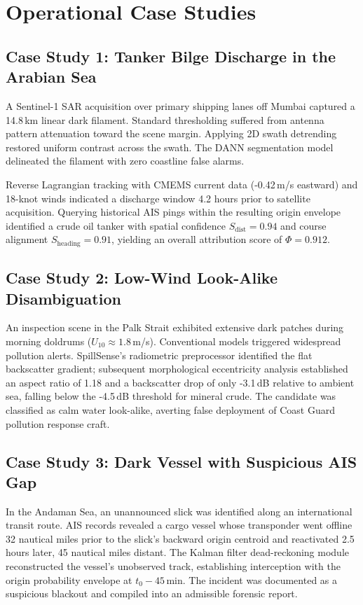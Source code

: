 \documentclass[conference]{IEEEtran}
\begin{document}
\section{Operational Case Studies}

\subsection{Case Study 1: Tanker Bilge Discharge in the Arabian Sea}
A Sentinel-1 SAR acquisition over primary shipping lanes off Mumbai captured a 14.8\,km linear dark filament. Standard thresholding suffered from antenna pattern attenuation toward the scene margin. Applying 2D swath detrending restored uniform contrast across the swath. The DANN segmentation model delineated the filament with zero coastline false alarms. 

Reverse Lagrangian tracking with CMEMS current data (-0.42\,m/s eastward) and 18-knot winds indicated a discharge window 4.2 hours prior to satellite acquisition. Querying historical AIS pings within the resulting origin envelope identified a crude oil tanker with spatial confidence $S_{\text{dist}} = 0.94$ and course alignment $S_{\text{heading}} = 0.91$, yielding an overall attribution score of $\Phi = 0.912$.

\subsection{Case Study 2: Low-Wind Look-Alike Disambiguation}
An inspection scene in the Palk Strait exhibited extensive dark patches during morning doldrums ($U_{10} \approx 1.8$\,m/s). Conventional models triggered widespread pollution alerts. SpillSense's radiometric preprocessor identified the flat backscatter gradient; subsequent morphological eccentricity analysis established an aspect ratio of 1.18 and a backscatter drop of only -3.1\,dB relative to ambient sea, falling below the -4.5\,dB threshold for mineral crude. The candidate was classified as calm water look-alike, averting false deployment of Coast Guard pollution response craft.

\subsection{Case Study 3: Dark Vessel with Suspicious AIS Gap}
In the Andaman Sea, an unannounced slick was identified along an international transit route. AIS records revealed a cargo vessel whose transponder went offline 32 nautical miles prior to the slick's backward origin centroid and reactivated 2.5 hours later, 45 nautical miles distant. The Kalman filter dead-reckoning module reconstructed the vessel's unobserved track, establishing interception with the origin probability envelope at $t_0 - 45$\,min. The incident was documented as a suspicious blackout and compiled into an admissible forensic report.
\end{document}
